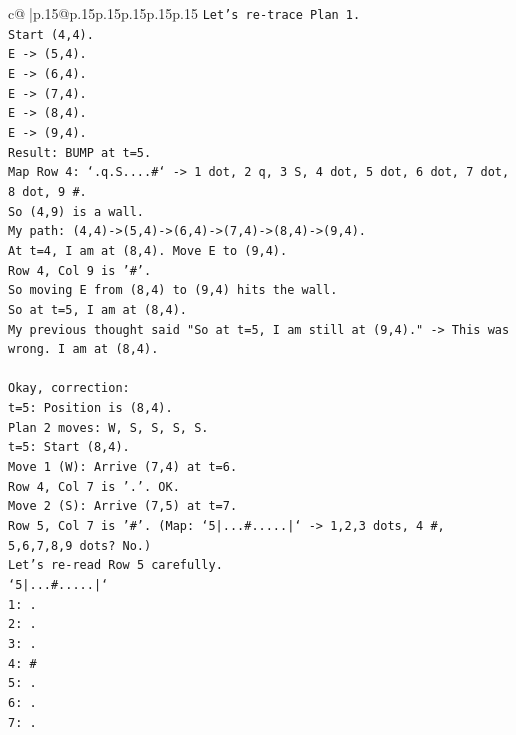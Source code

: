 \documentclass{article}
\begin{document}
{\begin{supertabular}{c@{$\;$}|p{.15\linewidth}@{}p{.15\linewidth}p{.15\linewidth}p{.15\linewidth}p{.15\linewidth}p{.15\linewidth}}
{{{\texttt{Let's re{-}trace Plan 1.} \\
\texttt{Start (4,4).} \\
\texttt{E {-}> (5,4).} \\
\texttt{E {-}> (6,4).} \\
\texttt{E {-}> (7,4).} \\
\texttt{E {-}> (8,4).} \\
\texttt{E {-}> (9,4).} \\
\texttt{Result: BUMP at t=5.} \\
\texttt{Map Row 4: `.q.S....\#` {-}> 1 dot, 2 q, 3 S, 4 dot, 5 dot, 6 dot, 7 dot, 8 dot, 9 \#.} \\
\texttt{So (4,9) is a wall.} \\
\texttt{My path: (4,4){-}>(5,4){-}>(6,4){-}>(7,4){-}>(8,4){-}>(9,4).} \\
\texttt{At t=4, I am at (8,4). Move E to (9,4).} \\
\texttt{Row 4, Col 9 is '\#'.} \\
\texttt{So moving E from (8,4) to (9,4) hits the wall.} \\
\texttt{So at t=5, I am at (8,4).} \\
\texttt{My previous thought said "So at t=5, I am still at (9,4)." {-}> This was wrong. I am at (8,4).} \\
\\ 
\texttt{Okay, correction:} \\
\texttt{t=5: Position is (8,4).} \\
\texttt{Plan 2 moves: W, S, S, S, S.} \\
\texttt{t=5: Start (8,4).} \\
\texttt{Move 1 (W): Arrive (7,4) at t=6.} \\
\texttt{Row 4, Col 7 is '.'. OK.} \\
\texttt{Move 2 (S): Arrive (7,5) at t=7.} \\
\texttt{Row 5, Col 7 is '\#'. (Map: `5|...\#.....|` {-}> 1,2,3 dots, 4 \#, 5,6,7,8,9 dots? No.)} \\
\texttt{Let's re{-}read Row 5 carefully.} \\
\texttt{`5|...\#.....|`} \\
\texttt{1: .} \\
\texttt{2: .} \\
\texttt{3: .} \\
\texttt{4: \#} \\
\texttt{5: .} \\
\texttt{6: .} \\
\texttt{7: .} \\
}}}
\end{supertabular}}
\end{document}
